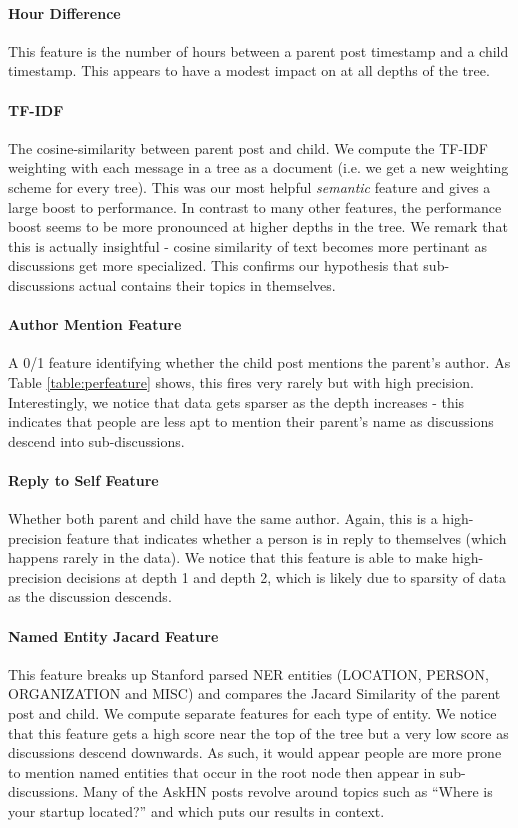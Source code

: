 \documentclass{article}
\begin{document}
\paragraph{Hour Difference} This feature is the number of hours between a parent 
post timestamp and a child timestamp. This appears to have a modest impact on
at all depths of the tree.

\paragraph{TF-IDF} The cosine-similarity between parent post and child. We compute the 
TF-IDF weighting with each message in a tree as a document (i.e. we get a new
weighting scheme for every tree). This was our most helpful \textit{semantic}
feature and gives a large boost to performance. In contrast to many other
features, the performance boost seems to be more pronounced at higher depths
in the tree. We remark that this is actually insightful - cosine similarity of
text becomes more pertinant as discussions get more specialized. This confirms
our hypothesis that sub-discussions actual contains their topics in
themselves.

\paragraph{Author Mention Feature} A 0/1 feature identifying whether the child 
post mentions the parent's author. As Table \ref{table:perfeature} shows, this
fires very rarely but with high precision. Interestingly, we notice that data
gets sparser as the depth increases - this indicates that people are less apt
to mention their parent's name as discussions descend into sub-discussions.

\paragraph{Reply to Self Feature} Whether both parent and child have the same
author. Again, this is a high-precision feature that indicates whether a
person is in reply to themselves (which happens rarely in the data). We notice
that this feature is able to make high-precision decisions at depth 1 and
depth 2, which is likely due to sparsity of data as the discussion descends.

\paragraph{Named Entity Jacard Feature} This feature breaks up Stanford parsed NER
entities (LOCATION, PERSON, ORGANIZATION and MISC) and compares the Jacard
Similarity of the parent post and child. We compute separate features for each
type of entity. We notice that this feature gets a high score near the top of
the tree but a very low score as  discussions descend downwards. As such, it
would appear people are more prone to mention named entities that occur in the
root node then appear in sub-discussions. Many of the AskHN posts revolve
around topics such as ``Where is your startup located?'' and which puts our
results in context.
\end{document}
